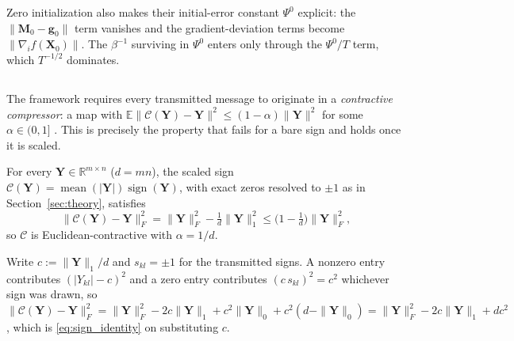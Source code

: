 Zero initialization also makes their initial-error constant $\Psi^0$ explicit: the $\|\mathbf{M}_0 - \mathbf{g}_0\|$ term vanishes and the gradient-deviation terms become $\|\nabla_i f(\mathbf{X}_0)\|$. The $\beta^{-1}$ surviving in $\Psi^0$ enters only through the $\Psi^0/T$ term, which $T^{-1/2}$ dominates.

\subsection{}

The framework requires every transmitted message to originate in a \emph{contractive compressor}: a map with $\mathbb{E}\|\mathcal{C}(\mathbf{Y})-\mathbf{Y}\|^2 \le (1-\alpha)\|\mathbf{Y}\|^2$ for some $\alpha \in (0,1]$ \citep[Def.~1]{gruntkowska2025error}. This is precisely the property that fails for a bare sign and holds once it is scaled.

\begin{lemma}\label{lem:signcontr}
For every $\mathbf{Y} \in \mathbb{R}^{m\times n}$ ($d = mn$), the scaled sign $\mathcal{C}(\mathbf{Y}) = \operatorname{mean}(|\mathbf{Y}|)\operatorname{sign}(\mathbf{Y})$, with exact zeros resolved to $\pm1$ as in Section~\ref{sec:theory}, satisfies
\begin{equation}\label{eq:sign_identity}
\|\mathcal{C}(\mathbf{Y})-\mathbf{Y}\|_F^2 = \|\mathbf{Y}\|_F^2 - \tfrac{1}{d}\|\mathbf{Y}\|_1^2 \le \bigl(1-\tfrac{1}{d}\bigr)\|\mathbf{Y}\|_F^2 ,
\end{equation}
so $\mathcal{C}$ is Euclidean-contractive with $\alpha = 1/d$. 
\end{lemma}
\begin{paperproof}
Write $c := \|\mathbf{Y}\|_1/d$ and $s_{kl}=\pm1$ for the transmitted signs. A nonzero entry contributes $(|Y_{kl}|-c)^2$ and a zero entry contributes $(c\,s_{kl})^2 = c^2$ whichever sign was drawn, so
$\|\mathcal{C}(\mathbf{Y})-\mathbf{Y}\|_F^2 = \|\mathbf{Y}\|_F^2 - 2c\|\mathbf{Y}\|_1 + c^2\|\mathbf{Y}\|_0 + c^2(d-\|\mathbf{Y}\|_0) = \|\mathbf{Y}\|_F^2 - 2c\|\mathbf{Y}\|_1 + dc^2$, which is \eqref{eq:sign_identity} on substituting $c$. 
\end{paperproof}

